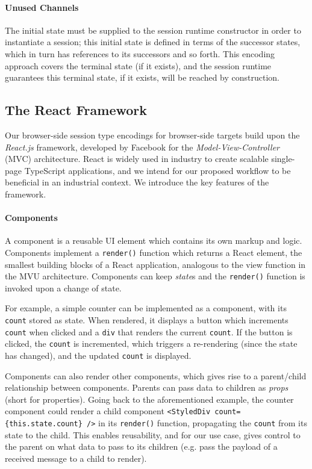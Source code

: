 \paragraph{Unused Channels}
The initial state must be supplied to the session runtime
constructor in order to instantiate a session;
this initial state is defined
in terms of the successor states, which in turn has references to its
successors and so forth.
This encoding approach covers the terminal state (if it exists), and the
session runtime guarantees this terminal state, if it exists, will be reached
by construction.

\subsection{The React Framework}
Our browser-side session type encodings for browser-side targets build upon the
\emph{React.js} framework, developed by Facebook \cite{React} for the
\textit{Model-View-Controller} (MVC) architecture.
React is widely used in industry to create scalable single-page TypeScript
applications, and we intend for our proposed workflow to be beneficial in an
industrial context.
We introduce the key features of the framework.

\paragraph{Components}
A component is a reusable UI element which
contains its own markup and logic.
Components implement a \texttt{render()} function which returns a React
element, the smallest building blocks of a React application, analogous to the
view function in the MVU architecture.
Components can keep \textit{state}s and the \texttt{render()} function is
invoked upon a change of state.

For example, a simple counter can be implemented as a component,
with its \texttt{count} stored as state.
When rendered, it displays a button which increments \texttt{count}
when clicked and a \texttt{div} that renders the current
\texttt{count}.
If the button is clicked, the \texttt{count} is incremented, which triggers a
re-rendering (since the state has changed), and the updated \texttt{count} is
displayed.

Components can also render other components, which gives rise
to a parent/child relationship between components.
Parents can pass data to children as \textit{props} (short for properties).
Going back to the aforementioned example, the counter component could
render a child component \texttt{<StyledDiv count=\{this.state.count\} />} in
its \texttt{render()} function, propagating the \texttt{count} from its state
to the child.
This enables reusability, and for our use case, gives control to the parent
on what data to pass to its children (e.g. pass the payload of a received
message to a child to render).

